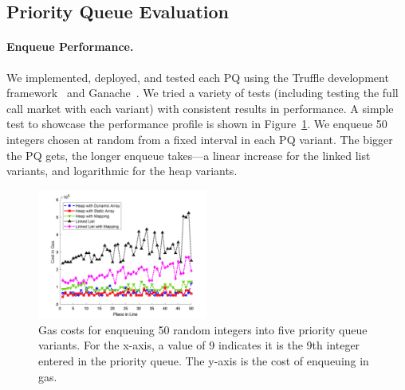 
\subsection{Priority Queue Evaluation} 

\paragraph{Enqueue Performance.} We implemented, deployed, and tested each PQ using the Truffle development framework~\cite{TruffleO71:online} and Ganache~\cite{GanacheT25:online}. We tried a variety of tests (including testing the full call market with each variant) with consistent results in performance. A simple test to showcase the performance profile is shown in Figure~\ref{fig:random_insertion}. We enqueue 50 integers chosen at random from a fixed interval in each PQ variant. The bigger the PQ gets, the longer enqueue takes---a linear increase for the linked list variants, and logarithmic for the heap variants. 



\begin{figure}[t]
\centering
\includegraphics[width=0.5\textwidth]{fig/random_insertion3.png}
\caption{Gas costs for enqueuing 50 random integers into five priority queue variants. For the x-axis, a value of 9 indicates it is the 9th integer entered in the priority queue. The y-axis is the cost of enqueuing in gas.  \label{fig:random_insertion}}
\end{figure}






